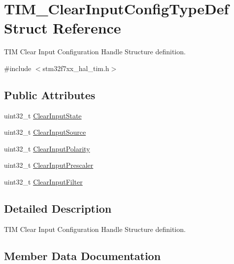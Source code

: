 \hypertarget{struct_t_i_m___clear_input_config_type_def}{}\section{T\+I\+M\+\_\+\+Clear\+Input\+Config\+Type\+Def Struct Reference}
\label{struct_t_i_m___clear_input_config_type_def}


T\+IM Clear Input Configuration Handle Structure definition.  




{\ttfamily \#include $<$stm32f7xx\+\_\+hal\+\_\+tim.\+h$>$}

\subsection*{Public Attributes}
\begin{DoxyCompactItemize}
\item 
uint32\+\_\+t \mbox{\hyperlink{struct_t_i_m___clear_input_config_type_def_a01d4b91dd297c4f0582a4d9179abf32f}{Clear\+Input\+State}}
\item 
uint32\+\_\+t \mbox{\hyperlink{struct_t_i_m___clear_input_config_type_def_a776d2f14021a82e022468fd46594b8a0}{Clear\+Input\+Source}}
\item 
uint32\+\_\+t \mbox{\hyperlink{struct_t_i_m___clear_input_config_type_def_a49dbc65edc5316822fcabd61cc8409de}{Clear\+Input\+Polarity}}
\item 
uint32\+\_\+t \mbox{\hyperlink{struct_t_i_m___clear_input_config_type_def_a509cecb64fec71391ddc8b4703e09cfe}{Clear\+Input\+Prescaler}}
\item 
uint32\+\_\+t \mbox{\hyperlink{struct_t_i_m___clear_input_config_type_def_a6d2e06a970e30aaf4f8a6091e443eecf}{Clear\+Input\+Filter}}
\end{DoxyCompactItemize}


\subsection{Detailed Description}
T\+IM Clear Input Configuration Handle Structure definition. 

\subsection{Member Data Documentation}
\mbox{\label{struct_t_i_m___clear_input_config_type_def_a6d2e06a970e30aaf4f8a6091e443eecf}} 
